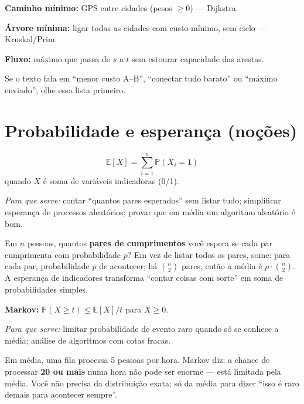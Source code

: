 \begin{exemplodiabox}
\textbf{Caminho mínimo:} GPS entre cidades (pesos $\ge 0$) --- Dijkstra.

\textbf{Árvore mínima:} ligar todas as cidades com custo mínimo, sem ciclo --- Kruskal/Prim.

\textbf{Fluxo:} máximo que passa de $s$ a $t$ sem estourar capacidade das arestas.

Se o texto fala em ``menor custo A--B'', ``conectar tudo barato'' ou ``máximo enviado'', olhe essa lista primeiro.
\end{exemplodiabox}


\section{Probabilidade e esperança (noções)}

\begin{equation}
  \mathbb{E}[X] = \sum_{i=1}^{n} \mathbb{P}(X_i = 1)
\end{equation}
quando $X$ é soma de variáveis indicadoras (0/1).

\emph{Para que serve:} contar ``quantos pares esperados'' sem listar tudo; simplificar esperança de processos aleatórios; provar que em média um algoritmo aleatório é bom.

\begin{exemplodiabox}
Em $n$ pessoas, quantos \textbf{pares de cumprimentos} você espera se cada par cumprimenta com probabilidade $p$? Em vez de listar todos os pares, some: para cada par, probabilidade $p$ de acontecer; há $\binom{n}{2}$ pares, então a média é $p \cdot \binom{n}{2}$. A esperança de indicadores transforma ``contar coisas com sorte'' em soma de probabilidades simples.
\end{exemplodiabox}


\textbf{Markov:} $\mathbb{P}(X \ge t) \le \mathbb{E}[X]/t$ para $X \ge 0$.

\emph{Para que serve:} limitar probabilidade de evento raro quando só se conhece a média; análise de algoritmos com cotas fracas.

\begin{exemplodiabox}
Em média, uma fila processa 5 pessoas por hora. Markov diz: a chance de processar \textbf{20 ou mais} numa hora não pode ser enorme --- está limitada pela média. Você não precisa da distribuição exata; só da média para dizer ``isso é raro demais para acontecer sempre''.
\end{exemplodiabox}


